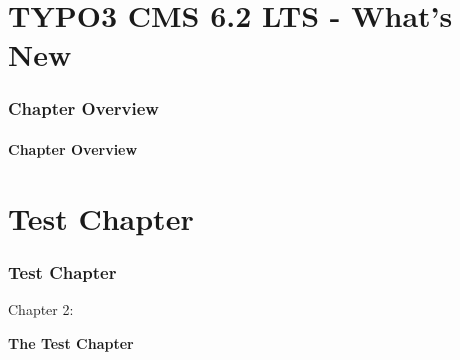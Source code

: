 \section*{TYPO3 CMS 6.2 LTS - What's New}
\begin{frame}[fragile]
	\frametitle{Chapter Overview}
	\framesubtitle{Chapter Overview}

	\begin{multicols}{2}
		\tableofcontents
	\end{multicols}

\end{frame}








\section{Test Chapter}
\begin{frame}[fragile]
	\frametitle{Test Chapter}

	\begin{center}\huge{Chapter 2:}\end{center}
	\begin{center}\huge{\color{typo3darkgrey}\textbf{The Test Chapter}}\end{center}

\end{frame}


